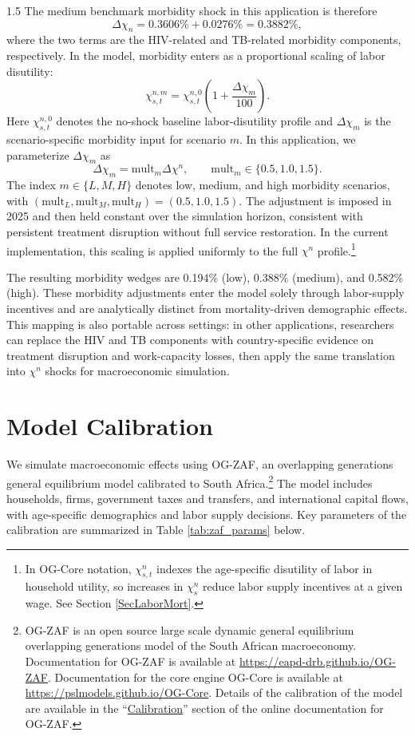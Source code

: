 \documentclass[letterpaper,12pt]{article}
\theoremstyle{definition}
\begin{document}
\begin{spacing}{1.5}
The medium benchmark morbidity shock in this application is therefore
\[
\Delta\chi_{n}=0.3606\%+0.0276\%=0.3882\%,
\]
where the two terms are the HIV-related and TB-related morbidity components, respectively. In the model, morbidity enters as a proportional scaling of labor disutility:
\[
\chi^{n,m}_{s,t}=\chi^{n,0}_{s,t}\left(1+\frac{\Delta\chi_m}{100}\right).
\]
Here $\chi^{n,0}_{s,t}$ denotes the no-shock baseline labor-disutility profile and $\Delta\chi_m$ is the scenario-specific morbidity input for scenario $m$. In this application, we parameterize $\Delta\chi_m$ as
\[
\Delta\chi_m=\mathrm{mult}_{m}\Delta\chi^{n},
\qquad
\mathrm{mult}_{m}\in\{0.5,1.0,1.5\}.
\]
The index $m\in\{L,M,H\}$ denotes low, medium, and high morbidity scenarios, with $(\mathrm{mult}_L, \mathrm{mult}_M, \mathrm{mult}_H) = (0.5,1.0,1.5)$. The adjustment is imposed in 2025 and then held constant over the simulation horizon, consistent with persistent treatment disruption without full service restoration. In the current implementation, this scaling is applied uniformly to the full $\chi^n$ profile.\footnote{In OG-Core notation, $\chi^n_{s,t}$ indexes the age-specific disutility of labor in household utility, so increases in $\chi^n_s$ reduce labor supply incentives at a given wage. See Section \ref{SecLaborMort}.}

The resulting morbidity wedges are 0.194\% (low), 0.388\% (medium), and 0.582\% (high). These morbidity adjustments enter the model solely through labor-supply incentives and are analytically distinct from mortality-driven demographic effects. This mapping is also portable across settings: in other applications, researchers can replace the HIV and TB components with country-specific evidence on treatment disruption and work-capacity losses, then apply the same translation into $\chi^n$ shocks for macroeconomic simulation.


\section{Model Calibration}\label{SecCalibration}

We simulate macroeconomic effects using OG-ZAF, an overlapping generations general equilibrium model calibrated to South Africa.\footnote{OG-ZAF is an open source large scale dynamic general equilibrium overlapping generations model of the South African macroeconomy. Documentation for OG-ZAF is available at \href{https://eapd-drb.github.io/OG-ZAF}{https://eapd-drb.github.io/OG-ZAF}. Documentation for the core engine OG-Core is available at \href{https://pslmodels.github.io/OG-Core}{https://pslmodels.github.io/OG-Core}. Details of the calibration of the model are available in the ``\href{https://eapd-drb.github.io/OG-ZAF/content/calibration/households.html}{Calibration}'' section of the online documentation for OG-ZAF.} The model includes households, firms, government taxes and transfers, and international capital flows, with age-specific demographics and labor supply decisions.  Key parameters of the calibration are summarized in Table \ref{tab:zaf_params} below.



\end{spacing}
\end{document}
